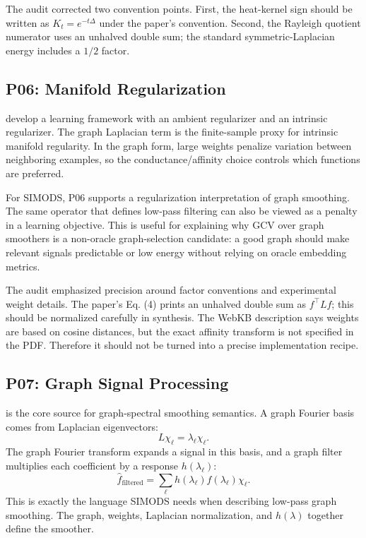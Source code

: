 \documentclass[11pt]{article}
\begin{document}
The audit corrected two convention points.  First, the heat-kernel sign should
be written as \(K_t=e^{-t\Delta}\) under the paper's convention.  Second, the
Rayleigh quotient numerator uses an unhalved double sum; the standard
symmetric-Laplacian energy includes a \(1/2\) factor.

\subsection{P06: Manifold Regularization}

\citet{belkin2006manifold} develop a learning framework with an ambient
regularizer and an intrinsic regularizer.  The graph Laplacian term is the
finite-sample proxy for intrinsic manifold regularity.  In the graph form,
large weights penalize variation between neighboring examples, so the
conductance/affinity choice controls which functions are preferred.

For SIMODS, P06 supports a regularization interpretation of graph smoothing.
The same operator that defines low-pass filtering can also be viewed as a
penalty in a learning objective.  This is useful for explaining why GCV over
graph smoothers is a non-oracle graph-selection candidate: a good graph should
make relevant signals predictable or low energy without relying on oracle
embedding metrics.

The audit emphasized precision around factor conventions and experimental
weight details.  The paper's Eq. (4) prints an unhalved double sum as
\(f^\top Lf\); this should be normalized carefully in synthesis.  The WebKB
description says weights are based on cosine distances, but the exact affinity
transform is not specified in the PDF.  Therefore it should not be turned into
a precise implementation recipe.

\subsection{P07: Graph Signal Processing}

\citet{shuman2013emerging} is the core source for graph-spectral smoothing
semantics.  A graph Fourier basis comes from Laplacian eigenvectors:
\[
  L\chi_\ell=\lambda_\ell\chi_\ell.
\]
The graph Fourier transform expands a signal in this basis, and a graph filter
multiplies each coefficient by a response \(h(\lambda_\ell)\):
\[
  \hat f_{\mathrm{filtered}}
  =
  \sum_\ell h(\lambda_\ell)\hat f(\lambda_\ell)\chi_\ell.
\]
This is exactly the language SIMODS needs when describing low-pass graph
smoothing.  The graph, weights, Laplacian normalization, and \(h(\lambda)\)
together define the smoother.
\end{document}
